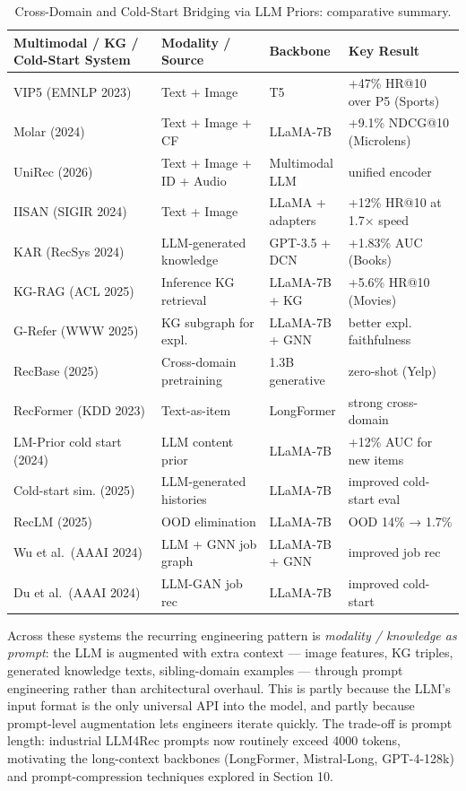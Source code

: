 \documentclass{article}
\begin{document}
\begin{table}[t]
\centering
\caption{Cross-Domain and Cold-Start Bridging via LLM Priors: comparative summary.}
\label{tab:cross-domain-and-cold-start-bridging-via-llm-priors}
\begin{tabular}{>{\raggedright\arraybackslash}p{0.3398\linewidth}
  >{\raggedright\arraybackslash}p{0.2427\linewidth}
  >{\raggedright\arraybackslash}p{0.1553\linewidth}
  >{\raggedright\arraybackslash}p{0.2621\linewidth}}
\toprule
Multimodal / KG / Cold-Start System & Modality / Source & Backbone & Key Result \\
\midrule
VIP5 (EMNLP 2023) & Text + Image & T5 & +47\% HR@10 over P5 (Sports) \\
Molar (2024) & Text + Image + CF & LLaMA-7B & +9.1\% NDCG@10 (Microlens) \\
UniRec (2026) & Text + Image + ID + Audio & Multimodal LLM & unified encoder \\
IISAN (SIGIR 2024) & Text + Image & LLaMA + adapters & +12\% HR@10 at 1.7× speed \\
KAR (RecSys 2024) & LLM-generated knowledge & GPT-3.5 + DCN & +1.83\% AUC (Books) \\
KG-RAG (ACL 2025) & Inference KG retrieval & LLaMA-7B + KG & +5.6\% HR@10 (Movies) \\
G-Refer (WWW 2025) & KG subgraph for expl. & LLaMA-7B + GNN & better expl. faithfulness \\
RecBase (2025) & Cross-domain pretraining & 1.3B generative & 0.0784 zero-shot (Yelp) \\
RecFormer (KDD 2023) & Text-as-item & LongFormer & strong cross-domain \\
LM-Prior cold start (2024) & LLM content prior & LLaMA-7B & +12\% AUC for new items \\
Cold-start sim. (2025) & LLM-generated histories & LLaMA-7B & improved cold-start eval \\
RecLM (2025) & OOD elimination & LLaMA-7B & OOD 14\% → 1.7\% \\
Wu et al.~(AAAI 2024) & LLM + GNN job graph & LLaMA-7B + GNN & improved job rec \\
Du et al.~(AAAI 2024) & LLM-GAN job rec & LLaMA-7B & improved cold-start \\
\end{tabular}
\end{table}

Across these systems the recurring engineering pattern is \emph{modality / knowledge as prompt}: the LLM is augmented with extra context --- image features, KG triples, generated knowledge texts, sibling-domain examples --- through prompt engineering rather than architectural overhaul. This is partly because the LLM's input format is the only universal API into the model, and partly because prompt-level augmentation lets engineers iterate quickly. The trade-off is prompt length: industrial LLM4Rec prompts now routinely exceed 4000 tokens, motivating the long-context backbones (LongFormer, Mistral-Long, GPT-4-128k) and prompt-compression techniques explored in Section 10.
\end{document}
